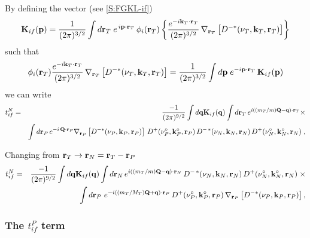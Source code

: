 By defining the vector (see \ref{S:FGKL-if})
\begin{equation}\label{Q:Kif}
  \mathbf{K}_{if}(\mathbf{p}) = \frac{1}{(2 \pi)^{3/2}} \int d \mathbf{r}_{T} \;
e^{\, i \mathbf{p} \cdot \mathbf{r}_{T}} \, \phi_{i}(\mathbf{r}_{T}) \left\{
\frac{e^{- i \mathbf{k}_{T} \cdot \mathbf{r}_{T}}}{(2
\pi)^{3/2}}\,\nabla_{\mathbf{r}_{T}} \left[
D^{-*}(\nu_{T},\mathbf{k}_{T},\mathbf{r}_{T}) \right] \right\}
\end{equation}
%
such that
\begin{equation}\label{Q:Fif-inv}
\phi_{i}(\mathbf{r}_{T}) \frac{ e^{- i \mathbf{k}_{T} \cdot \mathbf{r}_{T}}}
{(2 \pi)^{3/2}} \,\nabla_{\mathbf{r}_{T}} \left[
D^{-*}(\nu_{T},\mathbf{k}_{T},\mathbf{r}_{T}) \right]  = \frac{1}{(2
\pi)^{3/2}} \int d \mathbf{p} \; e^{- i \mathbf{p} \cdot \mathbf{r}_{T}}
\,\mathbf{K}_{if}(\mathbf{p})
\end{equation}
%
we can write
\begin{eqnarray*}
t^{N}_{if}&=& \frac{-1}{(2 \pi)^{9/2}} \int d \mathbf{q}
\mathbf{K}_{if}(\mathbf{q}) \int d \mathbf{r}_{T} \, e^{i \left(
(m_{T}/m)\mathbf{Q} - \mathbf{q} \right) \cdot \mathbf{r}_{T}} {\times}
  \\
&& \int d \mathbf{r}_{P} \, e^{- i \, \mathbf{Q} \cdot \mathbf{r}_{P}}
\nabla_{\mathbf{r}_{P}}\left[ D^{-*}(\nu_{P},\mathbf{k}_{P},\mathbf{r}_{P}) \right]
\, D^{+}(\nu_{P}^{\circ},\mathbf{k}_{P}^{\circ},\mathbf{r}_{P}) \, D^{-\,\ast}(\nu_{N},
\mathbf{k}_{N}, \mathbf{r}_{N} ) \, D^{+}(\nu_{N}^{\circ}, \mathbf{k}_{N}^{\circ}, \mathbf{r}_{N}) \;
,\nonumber
\end{eqnarray*}

Changing from $\mathbf{r}_{T} \to \mathbf{r}_{N}= \mathbf{r}_{T} - \mathbf{r}_{P}$
\begin{eqnarray} \label{Q:tifcdws1}
t^{N}_{if}&=& \frac{-1}{(2 \pi)^{9/2}} \int d \mathbf{q}
\mathbf{K}_{if}(\mathbf{q}) \int d \mathbf{r}_{N} \, e^{i \left(
(m_{T}/m)\mathbf{Q} - \mathbf{q} \right) \cdot \mathbf{r}_{N}} \,
 D^{-\,\ast}(\nu_{N},
\mathbf{k}_{N}, \mathbf{r}_{N} ) \, D^{+}(\nu_{N}^{\circ},\mathbf{k}_{N}^{\circ},\mathbf{r}_{N})\; {\times}
  \\
&& \int d \mathbf{r}_{P} \, \,e^{ -i \left((m_{T}/M_{T})\mathbf{Q}+
\mathbf{q} \right) \cdot \mathbf{r}_{P}} \,
D^{+}(\nu_{P}^{\circ},\mathbf{k}_{P}^{\circ},\mathbf{r}_{P}) \, \nabla_{\mathbf{r}_{P}}\left[
D^{-*}(\nu_{P},\mathbf{k}_{P},\mathbf{r}_{P}) \right] ,\nonumber
\end{eqnarray}

\subsubsection{The $t^{P}_{if}$ term}

